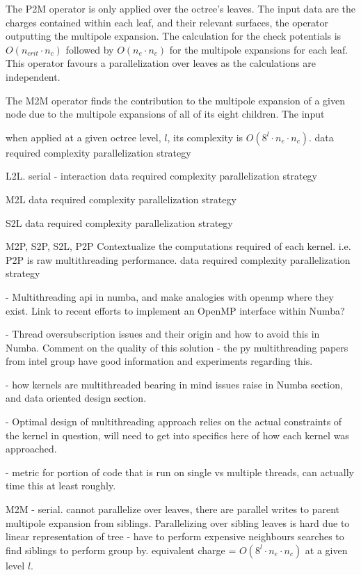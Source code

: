 \documentclass{IEEEcsmag}
\begin{document}
The P2M operator is only applied over the octree's leaves. The input data are the charges contained within each leaf, and their relevant surfaces, the operator outputting the multipole expansion. The calculation for the check potentials is $O(n_{crit} \cdot n_c)$ followed by $O(n_e \cdot n_c)$ for the multipole expansions for each leaf. This operator favours a parallelization over leaves as the calculations are independent.

The M2M operator finds the contribution to the multipole expansion of a given node due to the multipole expansions of all of its eight children. The input

when applied at a given octree level, $l$, its complexity is $O(8^l \cdot n_e \cdot n_c)$.
data required
complexity
parallelization strategy

L2L. serial - interaction
data required
complexity
parallelization strategy

M2L
data required
complexity
parallelization strategy

S2L
data required
complexity
parallelization strategy

M2P, S2P, S2L, P2P
Contextualize the computations required of each kernel. i.e. P2P is raw multithreading performance.
data required
complexity
parallelization strategy

- Multithreading api in numba, and make analogies with openmp where they exist. Link to recent efforts to implement an OpenMP interface within Numba?

- Thread oversubscription issues and their origin and how to avoid this in Numba. Comment on the quality of this solution - the py multithreading papers from intel group have good information and experiments regarding this.

- how kernels are multithreaded bearing in mind issues raise in Numba section, and data oriented design section.

- Optimal design of multithreading approach relies on the actual constraints of the kernel in question, will need to get into specifics here of how each kernel was approached.

- metric for portion of code that is run on single vs multiple threads, can actually time this at least roughly.

M2M
- serial. cannot parallelize over leaves, there are parallel writes to parent multipole expansion from siblings. Parallelizing over sibling leaves is hard due to linear representation of tree - have to perform expensive neighbours searches to find siblings to perform group by. equivalent charge = $O(8^l \cdot n_e \cdot n_c)$ at a given level $l$.
\end{document}
